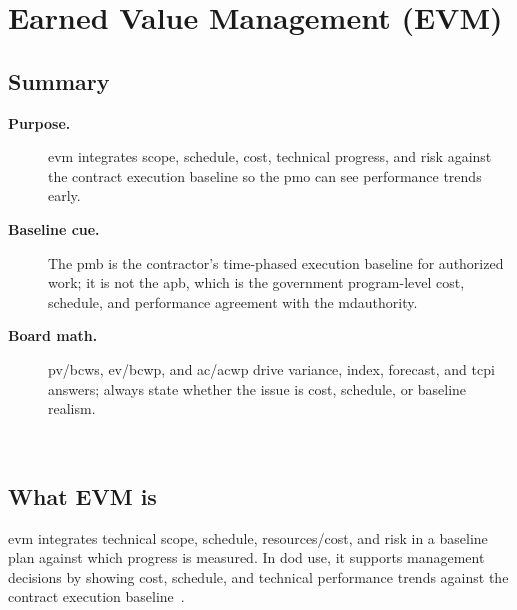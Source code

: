 \documentclass[../main.tex]{subfiles}
\begin{document}

\section{Earned Value Management (EVM)}

\subsection{Summary}
\begin{description}
  \item[\textbf{Purpose.}] \ac{evm} integrates scope, schedule, cost, technical progress, and risk against the contract
  execution baseline so the \ac{pmo} can see performance trends early.
  \item[\textbf{Baseline cue.}] The \ac{pmb} is the contractor's time-phased execution baseline for authorized work; it is
  not the \ac{apb}, which is the government program-level cost, schedule, and performance agreement with the \ac{mdauthority}.
  \item[\textbf{Board math.}] \ac{pv}/\ac{bcws}, \ac{ev}/\ac{bcwp}, and \ac{ac}/\ac{acwp} drive variance, index,
  forecast, and \ac{tcpi} answers; always state whether the issue is cost, schedule, or baseline realism.
\end{description}
~

\subsection{What EVM is}

\ac{evm} integrates technical scope, schedule, resources/cost, and risk in a baseline plan against which progress is
measured. In \ac{dod} use, it supports management decisions by showing cost, schedule, and technical performance trends
against the contract execution baseline~\autocite{DoD-IPM-EVM-Definitions-2026}.
\end{document}
